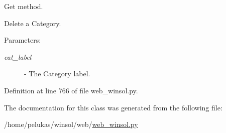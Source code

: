 Get method. 

Delete a Category.

\begin{Desc}
\item[Parameters:]
\begin{description}
\item[{\em cat\_\-label}]- The Category label. \end{description}
\end{Desc}


Definition at line 766 of file web\_\-winsol.py.

The documentation for this class was generated from the following file:\begin{CompactItemize}
\item 
/home/pelukas/winsol/web/\hyperlink{web__winsol_8py}{web\_\-winsol.py}\end{CompactItemize}
